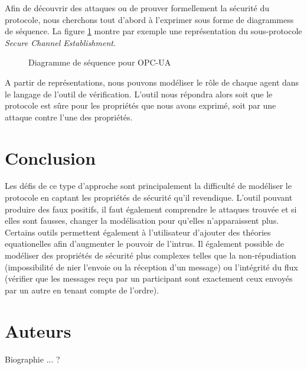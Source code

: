 \documentclass{article}
\newcommand{\proverif}{ProVerif}
\begin{document}
Afin de découvrir des attaques ou de prouver formellement la sécurité du protocole, nous cherchons tout d'abord à l'exprimer
sous forme de diagrammess de séquence.
La figure \ref{fig:opcua_diagram} montre par exemple une représentation du sous-protocole {\em Secure Channel Establishment}.

\begin{figure}[htb]
    
    \caption{Diagramme de séquence pour OPC-UA}
    \label{fig:opcua_diagram}
\end{figure}
    
%    

A partir de représentations, nous pouvons modéliser le rôle de chaque agent dans le langage de l'outil de vérification.
L'outil nous répondra alors soit que le protocole est sûre pour les propriétés que nous avons exprimé,
soit par une attaque contre l'une des propriétés.

\section{Conclusion}

Les défis de ce type d'approche sont principalement la difficulté de modéliser le protocole en captant les propriétés
de sécurité qu'il revendique.
L'outil pouvant produire des faux positifs, il faut également comprendre le attaques trouvée et si elles sont fausses,
changer la modélisation pour qu'elles n'apparaissent plus.
Certains outils permettent également à l'utilisateur d'ajouter des théories equationelles afin d'augmenter
le pouvoir de l'intrus.
Il également possible de modéliser des propriétés de sécurité plus complexes telles que la non-répudiation
(impossibilité de nier l'envoie ou la réception d'un message) ou l'intégrité du flux (vérifier que les messages
reçu par un participant sont exactement ceux envoyés par un autre en tenant compte de l'ordre).

\section{Auteurs}

Biographie ... ?



\end{document}
